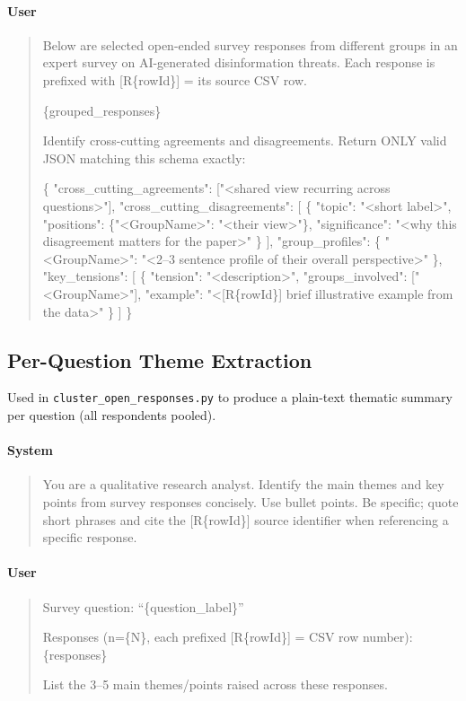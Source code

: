 \paragraph{User}
\begin{quote}\small\ttfamily
Below are selected open-ended survey responses from different groups in
an expert survey on AI-generated disinformation threats.
Each response is prefixed with [R\{rowId\}] = its source CSV row.

\{grouped\_responses\}

Identify cross-cutting agreements and disagreements.
Return ONLY valid JSON matching this schema exactly:

\{
  "cross\_cutting\_agreements": ["<shared view recurring across questions>"],
  "cross\_cutting\_disagreements": [
    \{
      "topic": "<short label>",
      "positions": \{"<GroupName>": "<their view>"\},
      "significance": "<why this disagreement matters for the paper>"
    \}
  ],
  "group\_profiles": \{
    "<GroupName>": "<2--3 sentence profile of their overall perspective>"
  \},
  "key\_tensions": [
    \{
      "tension": "<description>",
      "groups\_involved": ["<GroupName>"],
      "example": "<[R\{rowId\}] brief illustrative example from the data>"
    \}
  ]
\}
\end{quote}

\subsection{Per-Question Theme Extraction}
\label{app:prompt-themes}

Used in \texttt{cluster\_open\_responses.py} to produce a plain-text
thematic summary per question (all respondents pooled).

\paragraph{System}
\begin{quote}\small\ttfamily
You are a qualitative research analyst.
Identify the main themes and key points from survey responses concisely.
Use bullet points. Be specific; quote short phrases and cite the
[R\{rowId\}] source identifier when referencing a specific response.
\end{quote}

\paragraph{User}
\begin{quote}\small\ttfamily
Survey question: ``\{question\_label\}''

Responses (n=\{N\}, each prefixed [R\{rowId\}] = CSV row number):
\{responses\}

List the 3--5 main themes/points raised across these responses.
\end{quote}

